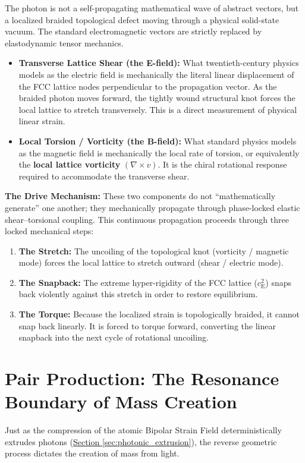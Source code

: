 The photon is not a self-propagating mathematical wave of abstract vectors, but a localized braided topological defect moving through a physical solid-state vacuum. The standard electromagnetic vectors are strictly replaced by elastodynamic tensor mechanics.
\begin{itemize}
    \item \textbf{Transverse Lattice Shear (the E-field):} What twentieth-century physics models as the electric field is mechanically the literal linear displacement of the FCC lattice nodes perpendicular to the propagation vector. As the braided photon moves forward, the tightly wound structural knot forces the local lattice to stretch transversely. This is a direct measurement of physical linear strain.
    \item \textbf{Local Torsion / Vorticity (the B-field):} What standard physics models as the magnetic field is mechanically the local rate of torsion, or equivalently the \textbf{local lattice vorticity} $(\nabla\times v)$. It is the chiral rotational response required to accommodate the transverse shear.
\end{itemize}

\vspace{0.5em}
\noindent\textbf{The Drive Mechanism:} These two components do not ``mathematically generate'' one another; they mechanically propagate through phase-locked elastic shear--torsional coupling. This continuous propagation proceeds through three locked mechanical steps: 
\begin{enumerate}
    \item \textbf{The Stretch:} The uncoiling of the topological knot (vorticity / magnetic mode) forces the local lattice to stretch outward (shear / electric mode). 
    \item \textbf{The Snapback:} The extreme hyper-rigidity of the FCC lattice ($c_{\mathrm{E}}^2$) snaps back violently against this stretch in order to restore equilibrium. 
    \item \textbf{The Torque:} Because the localized strain is topologically braided, it cannot snap back linearly. It is forced to torque forward, converting the linear snapback into the next cycle of rotational uncoiling.
\end{enumerate}

\section{Pair Production: The Resonance Boundary of Mass Creation}
Just as the compression of the atomic Bipolar Strain Field deterministically extrudes photons (\hyperref[sec:photonic_extrusion]{Section \ref*{sec:photonic_extrusion}}), the reverse geometric process dictates the creation of mass from light.

